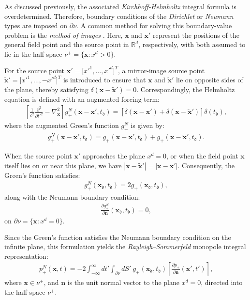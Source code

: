 \documentclass[11pt,reqno]{amsart}
\theoremstyle{remark}
\theoremstyle{italic_lemma}
\newcommand{\bx}{\boldsymbol{x}}
\newcommand{\bn}{\boldsymbol{n}}
\newcommand{\fd}{\mathfrak{d}}
\begin{document}
As discussed previously, the associated \textit{Kirchhoff-Helmholtz} integral formula is overdetermined. Therefore, boundary conditions of the \textit{Dirichlet} or \textit{Neumann} types are imposed on \( \partial \nu \). A common method for solving this boundary-value problem is the \textit{method of images} \cite{Devaney}. Here, \( \bx \) and \( \bx' \) represent the positions of the general field point and the source point in $\mathbb{R}^d$, respectively, with both assumed to lie in the half-space \( \nu^+ = \{\bx : x^d > 0\} \). 

For the source point \( \bx' = \big[ x'^1, \ldots, x'^d \big]^T \), a mirror-image source point \( \tilde{\bx}' = \big[ x'^1, \ldots, -x'^d \big]^T \) is introduced to ensure that \( \bx \) and \( \tilde{\bx}' \) lie on opposite sides of the plane, thereby satisfying \( \delta(\bx - \tilde{\bx}') = 0 \). Correspondingly, the Helmholtz equation is defined with an augmented forcing term:
\begin{align} \label{eq:holm-med}
   \left[ \frac{1}{c^2} \frac{\partial^2}{\partial t'^2} -  \nabla_{\bx}^2 \right] g_+^N(\bx - \bx', t_{\fd}) = \left[ \delta(\bx - \bx') + \delta(\bx - \tilde{\bx}') \right] \delta(t_{\fd}),
\end{align}
where the augmented Green's function \( g_+^N \) is given by:
\begin{align} \label{eq:neu}
    g_+^N(\bx - \bx', t_{\fd}) = g_+(\bx - \bx', t_{\fd}) + g_+(\bx - \tilde{\bx}', t_{\fd} ).
\end{align}

When the source point \( \bx' \) approaches the plane \( x^d = 0 \), or when the field point \( \bx \) itself lies on or near this plane, we have \( |\bx - \tilde{\bx}'| = |\bx - \bx'| \). Consequently, the Green's function satisfies:
\begin{align} \label{eq:neu1}
    g_+^N(\bx_{\fd}, t_{\fd}) = 2 g_+(\bx_{\fd}, t_{\fd}),
\end{align}
along with the Neumann boundary condition:
\begin{align}\label{eq:neu-b}
    \frac{\partial g_+^N}{\partial \bn}(\bx_{\fd}, t_{\fd}) = 0,
\end{align}
on \( \partial \nu = \{ \bx : x^d = 0 \} \).

\noindent
Since the Green's function satisfies the Neumann boundary condition on the infinite plane, this formulation yields the \textit{Rayleigh–Sommerfeld} monopole integral representation:
\begin{align} \label{eq:gr-rsn}
    p_+^N(\bx, t) = 
    -2 \int_{-\infty}^{\infty} dt' \int_{\partial \nu} dS' \ g_+(\bx_{\fd}, t_{\fd}) \left[ \frac{\partial p_+}{\partial \bn} (\bx', t')\right],
\end{align}
where \( \bx \in \nu^+ \), and \(\bn\) is the unit normal vector to the plane \(x^d = 0\), directed into the half-space \(\nu^+\).
\end{document}
